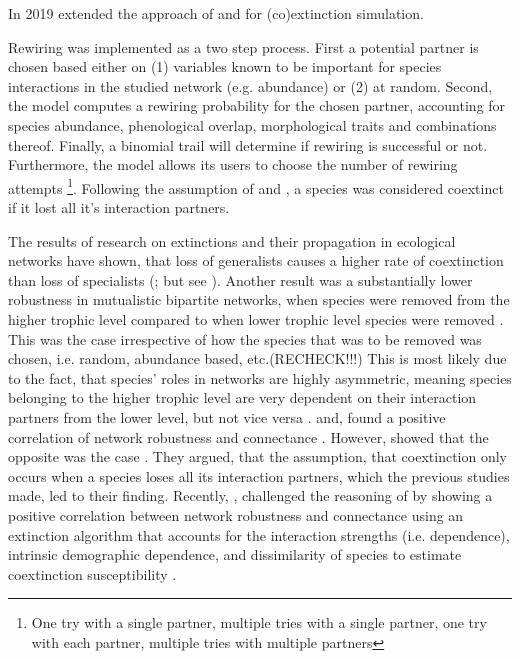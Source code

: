 \documentclass[12pt,a4paper]{article}
\begin{document}
In 2019 \citeauthor{Vizentin-Bugoni2019} extended the approach of \citeauthor{Memmott2004} and \citeauthor{Dunne2002} \parencite{Memmott2004, Dunne2002} for (co)extinction simulation.

Rewiring was implemented as a two step process. First a potential partner is chosen based either on (1) variables known to be important for species interactions in the studied network (e.g. abundance) or (2) at random. Second, the model computes a rewiring probability for the chosen partner, accounting for species abundance, phenological overlap, morphological traits and combinations thereof. Finally, a binomial trail will determine if rewiring is successful or not. Furthermore, the model allows its users to choose the number of rewiring attempts \footnote{
One try with a single partner, 
multiple tries with a single partner, 
one try with each partner, 
multiple tries with multiple partners
}. Following the assumption of \citeauthor{Memmott2004} and \citeauthor{Dunne2002}, a species was considered coextinct if it lost all it's interaction partners.
\par

The results of research on extinctions and their propagation in ecological networks have shown, that loss of generalists causes a higher rate of coextinction than loss of specialists (\cite{Memmott2004, Kaiser-Bunbury2010, Traveset2017, Bastazini2018, Vizentin-Bugoni2019, Biella2020}; but see \cite{Dunne2002}).
Another result was a substantially lower robustness in mutualistic bipartite networks, when species were removed from the higher trophic level compared to when lower trophic level species were removed \parencite{Schleuning2016, Traveset2017}. This was the case irrespective of how the species that was to be removed was chosen, i.e. random, abundance based, etc.(RECHECK!!!) This is most likely due to the fact, that species' roles in networks are highly asymmetric, meaning species belonging to the higher trophic level are very dependent on their interaction partners from the lower level, but not vice versa \parencite{Bascompte2006}. 
\citeauthor{Dunne2002, Ekloef2006} and, \citeauthor{Thebault2010} found a positive correlation of network robustness and connectance \parencite{Dunne2002, Ekloef2006, Thebault2010}. However, \citeauthor{Vieira2015} showed that the opposite was the case \parencite{Vieira2015}. They argued, that the assumption, that coextinction only occurs when a species loses all its interaction partners, which the previous studies made, led to their finding. Recently, \citeauthor{Baumgartner2020}, challenged the reasoning of \citeauthor{Vieira2015} by showing a positive correlation between network robustness and connectance using an extinction algorithm that accounts for the interaction strengths (i.e. dependence), intrinsic demographic dependence, and dissimilarity of species to estimate coextinction susceptibility \parencite{Baumgartner2020}. 
\end{document}

